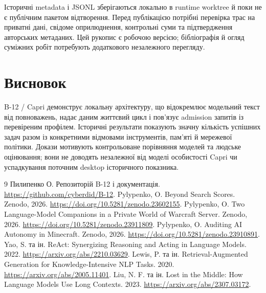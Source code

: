 \documentclass[11pt]{article}
\begin{document}
Історичні metadata і JSONL зберігаються локально в runtime worktree й поки не є публічним пакетом відтворення. Перед публікацією потрібні перевірка трас на приватні дані, свідоме оприлюднення, контрольні суми та підтвердження авторських метаданих. Цей рукопис є робочою версією; бібліографія й огляд суміжних робіт потребують додаткового незалежного перегляду.

\section{Висновок}
B-12 / Capri демонструє локальну архітектуру, що відокремлює модельний текст від повноважень, надає даним життєвий цикл і пов'язує admission запитів із перевіреним профілем. Історичні результати показують значну кількість успішних задач разом із конкретними відмовами інструментів, пам'яті й мережевої політики. Докази мотивують контрольоване порівняння моделей та людське оцінювання; вони не доводять незалежної від моделі особистості Capri чи успадкування поточним desktop історичного показника.

\begin{thebibliography}{9}
 Пилипенко О. Репозиторій B-12 і документація. \url{https://github.com/cyberdid/B-12}.
 Pylypenko, O. Beyond Search Scores. Zenodo, 2026. \url{https://doi.org/10.5281/zenodo.23602155}.
 Pylypenko, O. Two Language-Model Companions in a Private World of Warcraft Server. Zenodo, 2026. \url{https://doi.org/10.5281/zenodo.23911809}.
 Pylypenko, O. Auditing AI Autonomy in Minecraft. Zenodo, 2026. \url{https://doi.org/10.5281/zenodo.23910891}.
 Yao, S. та ін. ReAct: Synergizing Reasoning and Acting in Language Models. 2022. \url{https://arxiv.org/abs/2210.03629}.
 Lewis, P. та ін. Retrieval-Augmented Generation for Knowledge-Intensive NLP Tasks. 2020. \url{https://arxiv.org/abs/2005.11401}.
 Liu, N. F. та ін. Lost in the Middle: How Language Models Use Long Contexts. 2023. \url{https://arxiv.org/abs/2307.03172}.
\end{thebibliography}
\end{document}
